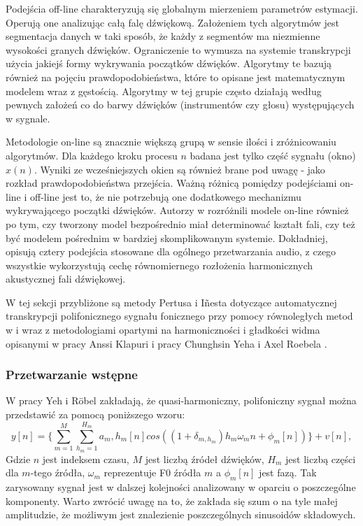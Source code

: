 \documentclass[12pt,a4paper,twoside]{mwart}
\begin{document}
Podejścia off-line charakteryzują się globalnym mierzeniem parametrów estymacji. Operują one analizując całą falę dźwiękową. Założeniem tych algorytmów jest segmentacja danych w taki sposób, że każdy z segmentów ma niezmienne wysokości granych dźwięków. Ograniczenie to wymusza na systemie transkrypcji użycia jakiejś formy wykrywania początków dźwięków. Algorytmy te bazują również na pojęciu prawdopodobieństwa, które to opisane jest matematycznym modelem wraz z gęstością. Algorytmy w tej grupie często działają według pewnych założeń co do barwy dźwięków (instrumentów czy głosu) występujących w sygnale.

Metodologie on-line są znacznie większą grupą w sensie ilości i zróżnicowaniu algorytmów. Dla każdego kroku procesu $n$ badana jest tylko część sygnału (okno) $x(n)$. Wyniki ze wcześniejszych okien są również brane pod uwagę - jako rozkład prawdopodobieństwa przejścia. Ważną różnicą pomiędzy podejściami on-line i off-line jest to, że nie potrzebują one dodatkowego mechanizmu wykrywającego początki dźwięków. Autorzy w 
\cite[203-227]{Transcription:Anssi:SignalProcessingMethods} 
rozróżnili modele on-line również po tym, czy tworzony model bezpośrednio miał determinować kształt fali, czy też być modelem pośrednim w bardziej skomplikowanym systemie. Dokładniej, opisują cztery podejścia stosowane dla ogólnego przetwarzania audio, z czego wszystkie wykorzystują cechę równomiernego rozłożenia harmonicznych akustycznej fali dźwiękowej.

W tej sekcji przybliżone są metody Pertusa i Iñesta dotyczące automatycznej transkrypcji polifonicznego sygnału fonicznego przy pomocy równoległych metod w \cite{Transcription:Pertus:Inharmonicity} i \cite{Transcription:Pertus:Inharmonicity2} wraz z metodologiami opartymi na harmoniczności i gładkości widma opisanymi w pracy Anssi Klapuri \cite{Transcription:Klapuri:MultipleFundamentalFrequencyEstimation} i pracy Chunghsin Yeha i Axel Roebela \cite{Transcription:Yeh:JointEvaluationF0}.

\subsubsection{Przetwarzanie wstępne}\label{sec:preProcessing} 
W pracy 
\cite[1]{Transcription:Yeh:JointEvaluationF0} 
Yeh i Röbel zakładają, że quasi-harmoniczny, polifoniczny sygnał można przedstawić za pomocą poniższego wzoru:
\begin{equation}\label{eq:Yeh:signal}
y[n] = \{ \sum_{m=1}^{M}\sum_{h_m = 1}^{H_m}a_m,h_m[n]cos((1 + \delta_{m,h_m})h_m\omega_m n + \phi_m [n])\} + v[n],
\end{equation}
Gdzie $n$ jest indeksem czasu, $M$ jest liczbą źródeł dźwięków, $H_m$ jest liczbą części dla $m$-tego źródła, $\omega_m$ reprezentuje F0 źródła $m$ a $\phi_m[n]$ jest fazą. Tak zarysowany sygnał jest w dalszej kolejności analizowany w oparciu o poszczególne komponenty. Warto zwrócić uwagę na to, że zakłada się szum o na tyle małej amplitudzie, że możliwym jest znalezienie poszczególnych sinusoidów składowych.
\end{document}
